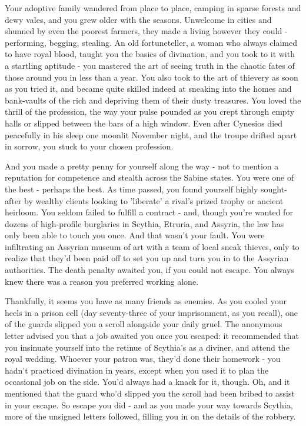 \documentclass[char]{Kos}
\begin{document}
    Your adoptive family wandered from place to place, camping in sparse forests and dewy vales, and you grew older with the seasons. Unwelcome in cities and shunned by even the poorest farmers, they made a living however they could - performing, begging, stealing. An old fortuneteller, a woman who always claimed to have royal blood, taught you the basics of divination, and you took to it with a startling aptitude - you mastered the art of seeing truth in the chaotic fates of those around you in less than a year. You also took to the art of thievery as soon as you tried it, and became quite skilled indeed at sneaking into the homes and bank-vaults of the rich and depriving them of their dusty treasures. You loved the thrill of the profession, the way your pulse pounded as you crept through empty halls or slipped between the bars of a high window. Even after Cynesios died peacefully in his sleep one moonlit November night, and the troupe drifted apart in sorrow, you stuck to your chosen profession. 

    And you made a pretty penny for yourself along the way - not to mention a reputation for competence and stealth across the Sabine states. You were one of the best - perhaps the best. As time passed, you found yourself highly sought-after by wealthy clients looking to 'liberate' a rival's prized trophy or ancient heirloom. You seldom failed to fulfill a contract - and, though you're wanted for dozens of high-profile burglaries in Scythia, Etruria, and Assyria, the law has only been able to touch you once. And that wasn't your fault. You were infiltrating an Assyrian museum of art with a team of local sneak thieves, only to realize that they'd been paid off to set you up and turn you in to the Assyrian authorities. The death penalty awaited you, if you could not escape. You always knew there was a reason you preferred working alone.

    Thankfully, it seems you have as many friends as enemies. As you cooled your heels in a prison cell (day seventy-three of your imprisonment, as you recall), one of the guards slipped you a scroll alongside your daily gruel. The anonymous letter advised you that a job awaited you once you escaped: it recommended that you insinuate yourself into the retinue of Scythia's \cScythiaKing{\monarch} as a diviner, and attend the royal wedding. Whoever your patron was, they'd done their homework - you hadn't practiced divination in years, except when you used it to plan the occasional job on the side. You'd always had a knack for it, though. Oh, and it mentioned that the guard who'd slipped you the scroll had been bribed to assist in your escape. So escape you did - and as you made your way towards Scythia, more of the unsigned letters followed, filling you in on the details of the robbery. 
\end{document}
